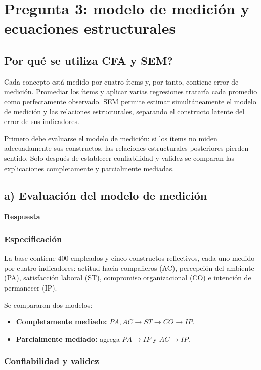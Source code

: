 \documentclass[11pt,letterpaper]{article}
\begin{document}
\section{Pregunta 3: modelo de medición y ecuaciones estructurales}

\subsection{\texorpdfstring{\textquestiondown Por qué se utiliza CFA y SEM?}{Por qué se utiliza CFA y SEM?}}

Cada concepto está medido por cuatro ítems y, por tanto, contiene error de medición. Promediar los ítems y aplicar varias regresiones trataría cada promedio como perfectamente observado. SEM permite estimar simultáneamente el modelo de medición y las relaciones estructurales, separando el constructo latente del error de sus indicadores.

Primero debe evaluarse el modelo de medición: si los ítems no miden adecuadamente sus constructos, las relaciones estructurales posteriores pierden sentido. Solo después de establecer confiabilidad y validez se comparan las explicaciones completamente y parcialmente mediadas.

\subsection{a) Evaluación del modelo de medición}

\textbf{Respuesta}

\subsubsection*{Especificación}

La base contiene 400 empleados y cinco constructos reflectivos, cada uno medido por cuatro indicadores: actitud hacia compañeros (AC), percepción del ambiente (PA), satisfacción laboral (ST), compromiso organizacional (CO) e intención de permanecer (IP).

Se compararon dos modelos:

\begin{itemize}
\item \textbf{Completamente mediado:} $PA,AC\rightarrow ST\rightarrow CO\rightarrow IP$.
\item \textbf{Parcialmente mediado:} agrega $PA\rightarrow IP$ y $AC\rightarrow IP$.
\end{itemize}

\subsubsection*{Confiabilidad y validez}
\end{document}
